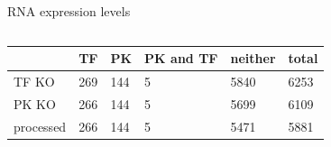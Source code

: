\begin{frame}{RNA expression levels}
\begin{columns}
\begin{column}{0.7\textwidth}
\end{column}
\end{columns}
% 
\small
\begin{table}[ht]
\begin{tabularx}{\textwidth}{@{}XXXXXX@{}}
    \toprule
    & TF & PK & PK and TF & neither & total \\
    \midrule
    TF KO & 269 & 144 & 5 & 5840 & 6253 \\
    PK KO & 266 & 144 & 5 & 5699 & 6109 \\
    processed & 266 & 144 & 5 & 5471 & 5881 \\
    \bottomrule
\end{tabularx}
\label{tab:process_counts}
\end{table}
\normalsize

\end{frame}